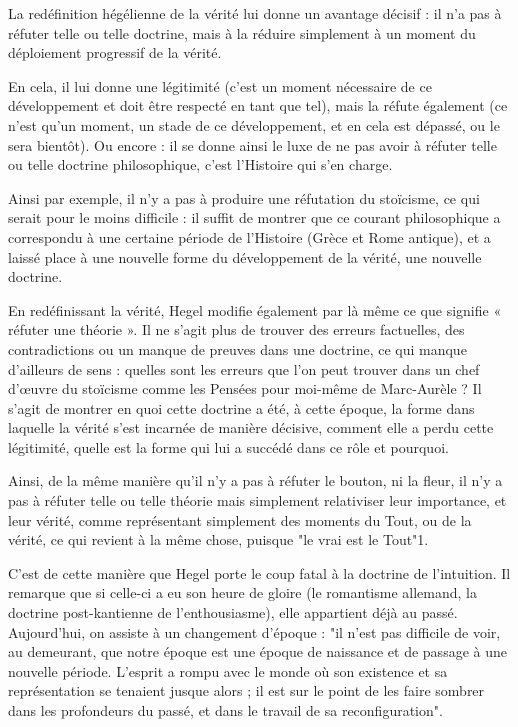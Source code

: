 La redéfinition hégélienne de la vérité lui donne un avantage décisif : il n’a pas à réfuter telle ou telle doctrine, mais à la réduire simplement à un moment du déploiement progressif de la vérité.

En cela, il lui donne une légitimité (c’est un moment nécessaire de ce développement et doit être respecté en tant que tel), mais la réfute également (ce n’est qu’un moment, un stade de ce développement, et en cela est dépassé, ou le sera bientôt). Ou encore : il se donne ainsi le luxe de ne pas avoir à réfuter telle ou telle doctrine philosophique, c’est l’Histoire qui s’en charge.

Ainsi par exemple, il n’y a pas à produire une réfutation du stoïcisme, ce qui serait pour le moins difficile : il suffit de montrer que ce courant philosophique a correspondu à une certaine période de l’Histoire (Grèce et Rome antique), et a laissé place à une nouvelle forme du développement de la vérité, une nouvelle doctrine.

En redéfinissant la vérité, Hegel modifie également par là même ce que signifie « réfuter une théorie ». Il ne s’agit plus de trouver des erreurs factuelles, des contradictions ou un manque de preuves dans une doctrine, ce qui manque d’ailleurs de sens : quelles sont les erreurs que l’on peut trouver dans un chef d’œuvre du stoïcisme comme les Pensées pour moi-même de Marc-Aurèle ? Il s’agit de montrer en quoi cette doctrine a été, à cette époque, la forme dans laquelle la vérité s’est incarnée de manière décisive, comment elle a perdu cette légitimité, quelle est la forme qui lui a succédé dans ce rôle et pourquoi.

Ainsi, de la même manière qu’il n’y a pas à réfuter le bouton, ni la fleur, il n’y a pas à réfuter telle ou telle théorie mais simplement relativiser leur importance, et leur vérité, comme représentant simplement des moments du Tout, ou de la vérité, ce qui revient à la même chose, puisque "le vrai est le Tout"1.

C’est de cette manière que Hegel porte le coup fatal à la doctrine de l’intuition. Il remarque que si celle-ci a eu son heure de gloire (le romantisme allemand, la doctrine post-kantienne de l’enthousiasme), elle appartient déjà au passé. Aujourd’hui, on assiste à un changement d’époque : "il n’est pas difficile de voir, au demeurant, que notre époque est une époque de naissance et de passage à une nouvelle période. L’esprit a rompu avec le monde où son existence et sa représentation se tenaient jusque alors ; il est sur le point de les faire sombrer dans les profondeurs du passé, et dans le travail de sa reconfiguration".


